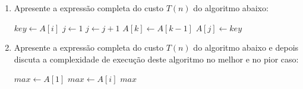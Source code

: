 \documentclass[9pt,a4paper]{extarticle}
\begin{document}
\begin{enumerate}
  \item Apresente a expressão completa do custo $T(n)$ do algoritmo abaixo:
  \begin{algorithmic}[1]
      \State $key \gets A[i]$
      \State $j \gets 1$
          \State $j \gets j + 1$
      \EndWhile
          \State $A[k] \gets A[k - 1]$
      \EndFor
      \State $A[j] \gets key$
  \EndFor
  \end{algorithmic}

  \item Apresente a expressão completa do custo $T(n)$ do algoritmo abaixo e depois discuta a complexidade de execução deste algoritmo no melhor e no pior caso:
  \begin{algorithmic}[1]
      \State $max \gets A[1]$
              \State $max \gets A[i]$
          \EndIf
      \EndFor
      \State \Return $max$
  \EndProcedure
  \end{algorithmic}
\end{enumerate}
\end{document}
